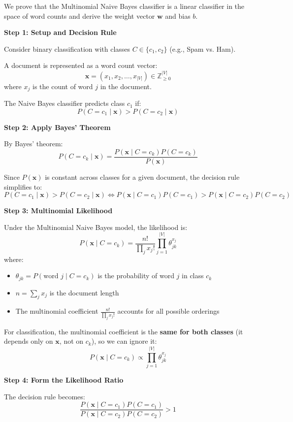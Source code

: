 \documentclass[12pt]{article}
\begin{document}
\begin{solution}
We prove that the Multinomial Naive Bayes classifier is a linear classifier in the space of word counts and derive the weight vector $\mathbf{w}$ and bias $b$.

\textbf{Step 1: Setup and Decision Rule}

Consider binary classification with classes $C \in \{c_1, c_2\}$ (e.g., Spam vs. Ham).

A document is represented as a word count vector:
\[
\mathbf{x} = (x_1, x_2, \ldots, x_{|V|}) \in \mathbb{Z}_{\geq 0}^{|V|}
\]
where $x_j$ is the count of word $j$ in the document.

The Naive Bayes classifier predicts class $c_1$ if:
\[
P(C = c_1 \mid \mathbf{x}) > P(C = c_2 \mid \mathbf{x})
\]

\textbf{Step 2: Apply Bayes' Theorem}

By Bayes' theorem:
\[
P(C = c_k \mid \mathbf{x}) = \frac{P(\mathbf{x} \mid C = c_k) P(C = c_k)}{P(\mathbf{x})}
\]

Since $P(\mathbf{x})$ is constant across classes for a given document, the decision rule simplifies to:
\[
P(C = c_1 \mid \mathbf{x}) > P(C = c_2 \mid \mathbf{x}) \iff P(\mathbf{x} \mid C = c_1) P(C = c_1) > P(\mathbf{x} \mid C = c_2) P(C = c_2)
\]

\textbf{Step 3: Multinomial Likelihood}

Under the Multinomial Naive Bayes model, the likelihood is:
\[
P(\mathbf{x} \mid C = c_k) = \frac{n!}{\prod_j x_j!} \prod_{j=1}^{|V|} \theta_{jk}^{x_j}
\]
where:
\begin{itemize}
    \item $\theta_{jk} = P(\text{word } j \mid C = c_k)$ is the probability of word $j$ in class $c_k$
    \item $n = \sum_j x_j$ is the document length
    \item The multinomial coefficient $\frac{n!}{\prod_j x_j!}$ accounts for all possible orderings
\end{itemize}

For classification, the multinomial coefficient is the \textbf{same for both classes} (it depends only on $\mathbf{x}$, not on $c_k$), so we can ignore it:
\[
P(\mathbf{x} \mid C = c_k) \propto \prod_{j=1}^{|V|} \theta_{jk}^{x_j}
\]

\textbf{Step 4: Form the Likelihood Ratio}

The decision rule becomes:
\[
\frac{P(\mathbf{x} \mid C = c_1) P(C = c_1)}{P(\mathbf{x} \mid C = c_2) P(C = c_2)} > 1
\]


\end{solution}
\end{document}
